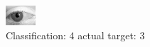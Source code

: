 \begin{figure}[h!]
\begin{center}
\includegraphics[width=0.60\columnwidth]{figures/ID2833_class_4_target_3.png}
\end{center}
\caption{ Classification: 4 actual target: 3}
\label{fig:ID2833_class_4_target_3}
\end{figure}
